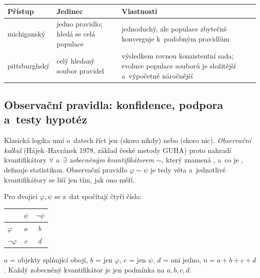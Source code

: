 \documentclass[11pt,a4paper]{article}
\theoremstyle{definition}
\begin{document}
\begin{center}
\small
\begin{tabular}{@{}lp{5.2cm}p{6.8cm}@{}}
\toprule
\textbf{Přístup} & \textbf{Jedinec} & \textbf{Vlastnosti} \\
\midrule
michiganský & jedno pravidlo; hledá se celá populace & jednoduchý, ale populace zbytečně
  konverguje k~podobným pravidlům \\
pittsburghský & celý hledaný soubor pravidel & výsledkem rovnou konzistentní sada;
  evoluce populace souborů je složitější a~výpočetně náročnější \\
\bottomrule
\end{tabular}
\end{center}

\subsection{Observační pravidla: konfidence, podpora a~testy hypotéz}
\label{ssec:observacni}

Klasická logika umí o~datech říct jen  (skoro nikdy) nebo  (skoro
nic). \emph{Observační kalkul} (Hájek--Havránek 1978, základ české metody GUHA) proto
nahradí kvantifikátory $\forall$ a~$\exists$ \emph{zobecněným kvantifikátorem} $\sim$,
který znamená , a~co je , definuje
statistikou. Observační pravidlo $\varphi\sim\psi$ je tedy věta  a~jednotlivé kvantifikátory se liší jen tím,
jak ono  měří.

\begin{defbox}
Pro dvojici $\varphi,\psi$ se z~dat spočítají čtyři čísla:
\begin{center}
\begin{tabular}{@{}lcc@{}}
\toprule
 & $\psi$ & $\neg\psi$ \\
\midrule
$\varphi$ & $a$ & $b$ \\
$\neg\varphi$ & $c$ & $d$ \\
\bottomrule
\end{tabular}
\end{center}
$a$ = objekty splňující obojí, $b$ = jen $\varphi$, $c$ = jen $\psi$, $d$ = ani jedno,
$n=a+b+c+d$. Každý zobecněný kvantifikátor je jen podmínka na $a,b,c,d$.
\end{defbox}
\end{document}
